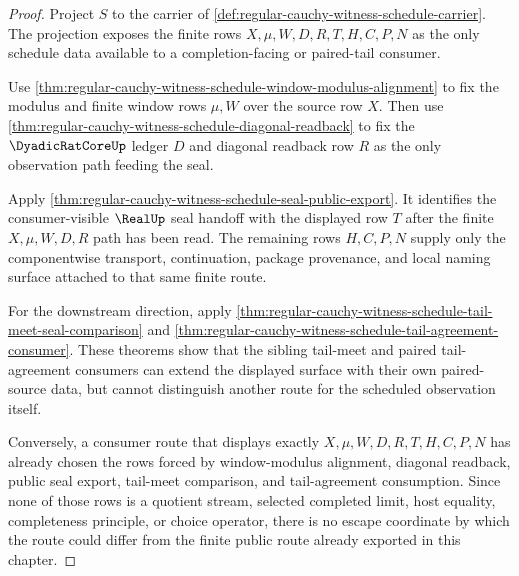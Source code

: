 \begin{proof}
Project $S$ to the carrier of \autoref{def:regular-cauchy-witness-schedule-carrier}. The projection exposes the finite rows $X,\mu,W,D,R,T,H,C,P,N$ as the only schedule data available to a completion-facing or paired-tail consumer.

Use \autoref{thm:regular-cauchy-witness-schedule-window-modulus-alignment} to fix the modulus and finite window rows $\mu,W$ over the source row $X$. Then use \autoref{thm:regular-cauchy-witness-schedule-diagonal-readback} to fix the $\DyadicRatCoreUp$ ledger $D$ and diagonal readback row $R$ as the only observation path feeding the seal.

Apply \autoref{thm:regular-cauchy-witness-schedule-seal-public-export}. It identifies the consumer-visible $\RealUp$ seal handoff with the displayed row $T$ after the finite $X,\mu,W,D,R$ path has been read. The remaining rows $H,C,P,N$ supply only the componentwise transport, continuation, package provenance, and local naming surface attached to that same finite route.

For the downstream direction, apply \autoref{thm:regular-cauchy-witness-schedule-tail-meet-seal-comparison} and \autoref{thm:regular-cauchy-witness-schedule-tail-agreement-consumer}. These theorems show that the sibling tail-meet and paired tail-agreement consumers can extend the displayed surface with their own paired-source data, but cannot distinguish another route for the scheduled observation itself.

Conversely, a consumer route that displays exactly $X,\mu,W,D,R,T,H,C,P,N$ has already chosen the rows forced by window-modulus alignment, diagonal readback, public seal export, tail-meet comparison, and tail-agreement consumption. Since none of those rows is a quotient stream, selected completed limit, host equality, completeness principle, or choice operator, there is no escape coordinate by which the route could differ from the finite public route already exported in this chapter.
\end{proof}

